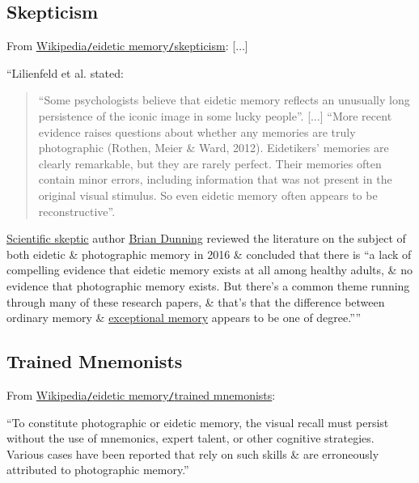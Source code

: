 \documentclass[oneside]{book}
\numberwithin{equation}{section}
\begin{document}
\subsection{Skepticism}
From \href{https://en.wikipedia.org/wiki/Eidetic_memory#Skepticism}{Wikipedia\texttt{/}eidetic memory\texttt{/}skepticism}: [$\ldots$]

``Lilienfeld et al. stated:
\begin{quotation}
	``Some psychologists believe that eidetic memory reflects an unusually long persistence of the iconic image in some lucky people''. [$\ldots$] ``More recent evidence raises questions about whether any memories are truly photographic (Rothen, Meier \& Ward, 2012). Eidetikers' memories are clearly remarkable, but they are rarely perfect. Their memories often contain minor errors, including information that was not present in the original visual stimulus. So even eidetic memory often appears to be reconstructive''.
\end{quotation}
\href{https://en.wikipedia.org/wiki/Skeptical_movement}{Scientific skeptic} author \href{https://en.wikipedia.org/wiki/Brian_Dunning_(author)}{Brian Dunning} reviewed the literature on the subject of both eidetic \& photographic memory in 2016 \& concluded that there is ``a lack of compelling evidence that eidetic memory exists at all among healthy adults, \& no evidence that photographic memory exists. But there's a common theme running through many of these research papers, \& that's that the difference between ordinary memory \& \href{https://en.wikipedia.org/wiki/Exceptional_memory}{exceptional memory} appears to be one of degree.''''

\subsection{Trained Mnemonists}
From \href{https://en.wikipedia.org/wiki/Eidetic_memory#Trained_mnemonists}{Wikipedia\texttt{/}eidetic memory\texttt{/}trained mnemonists}:

``To constitute photographic or eidetic memory, the visual recall must persist without the use of mnemonics, expert talent, or other cognitive strategies. Various cases have been reported that rely on such skills \& are erroneously attributed to photographic memory.''
\end{document}
